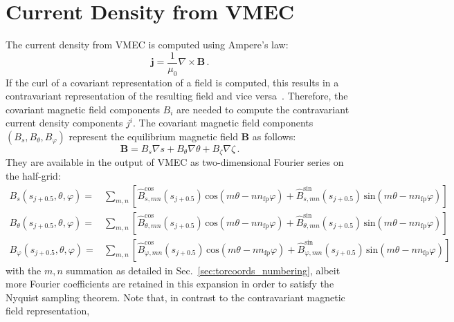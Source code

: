 \section{Current Density from VMEC}
The current density from VMEC is computed using Ampere's law:
\begin{equation}
 \mathbf{j} = \frac{1}{\mu_0} \nabla \times \mathbf{B} \, .
\end{equation}
%
If the curl of a covariant representation of a field is computed,
this results in a contravariant representation of the resulting field and vice versa~\cite{dHaseleer}.
%
Therefore, the covariant magnetic field components $B_i$ are needed
to compute the contravariant current density components $j^i$.
%
The covariant magnetic field components~$(B_s, B_\theta, B_\varphi)$ represent the equilibrium magnetic field $\mathbf{B}$ as follows:
\begin{equation}
 \mathbf{B} = B_s \nabla s + B_\theta \nabla \theta + B_\zeta \nabla \zeta \, .
\end{equation}
%
They are available in the output of VMEC as two-dimensional Fourier series on the half-grid:
\begin{align}
 B_s      (s_{j+0.5}, \theta, \varphi) =& \sum_{m,n} \left[  \hat{B}_{s,      mn}^\mathrm{cos} (s_{j+0.5}) \,\mathrm{cos}(m \theta - n n_\mathrm{fp} \varphi)
                                                            + \hat{B}_{s,      mn}^\mathrm{sin} (s_{j+0.5}) \,\mathrm{sin}(m \theta - n n_\mathrm{fp} \varphi) \right] \nonumber \\
 B_\theta (s_{j+0.5}, \theta, \varphi) =& \sum_{m,n} \left[  \hat{B}_{\theta, mn}^\mathrm{cos} (s_{j+0.5}) \,\mathrm{cos}(m \theta - n n_\mathrm{fp} \varphi)
                                                            + \hat{B}_{\theta, mn}^\mathrm{sin} (s_{j+0.5}) \,\mathrm{sin}(m \theta - n n_\mathrm{fp} \varphi) \right] \\
 B_\varphi  (s_{j+0.5}, \theta, \varphi) =& \sum_{m,n} \left[  \hat{B}_{\varphi,  mn}^\mathrm{cos} (s_{j+0.5}) \,\mathrm{cos}(m \theta - n n_\mathrm{fp} \varphi)
                                                            + \hat{B}_{\varphi,  mn}^\mathrm{sin} (s_{j+0.5}) \,\mathrm{sin}(m \theta - n n_\mathrm{fp} \varphi) \right] \nonumber
\end{align}
with the $m,n$ summation as detailed in Sec.~\ref{sec:torcoords_numbering},
albeit more Fourier coefficients are retained in this expansion
in order to satisfy the Nyquist sampling theorem.
%
Note that, in contrast to the contravariant magnetic field representation,
